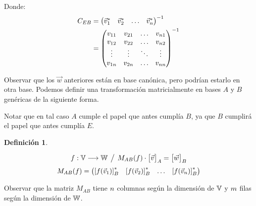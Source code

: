 \documentclass[a5paper,12pt,twoside]{book}
\newtheorem{defn}{{Definición}}[chapter]
\begin{document}
Donde:
\begin{align*}
    C_{EB} &=
    \begin{pmatrix}
        \Vec{v}_1^* & \Vec{v}_2^* & \dots & \Vec{v}_n^*
    \end{pmatrix}^{-1}
    \\
    &=
    \begin{pmatrix}
        v_{11} & v_{21} & \dots & v_{n 1}
        \\
        v_{12} & v_{22} & \dots & v_{n 2}
        \\
        \vdots & \vdots & \ddots & \vdots
        \\
        v_{1 n} & v_{2 n} & \dots & v_{n n}
    \end{pmatrix}^{-1}
\end{align*}

Observar que los $\Vec{w}$ anteriores están en base canónica, pero podrían estarlo en otra base.
Podemos definir una transformación matricialmente en bases $A$ y $B$ genéricas de la siguiente forma.

Notar que en tal caso $A$ cumple el papel que antes cumplía $B$, ya que $B$ cumplirá el papel que antes cumplía $E$.

\begin{mdframed}[style=DefinitionFrame]
    \begin{defn}
    \end{defn}
    \begin{equation*}
        f: \mathbb{V} \longrightarrow \mathbb{W} \hspace{1ex} \big/ \hspace{1ex} M_{AB}(f) \cdot { \begin{bmatrix} \Vec{v} \end{bmatrix} }_A = { \begin{bmatrix} \Vec{w} \end{bmatrix} }_B
    \end{equation*}
    \begin{equation*}
        M_{AB} (f) =
        \begin{pmatrix}
            \left[f(\Vec{v}_1)\right]_{B}^* &
            \left[f(\Vec{v}_2)\right]_{B}^* &
            \dots &
            \left[f(\Vec{v}_n)\right]_{B}^*
        \end{pmatrix}
    \end{equation*}
\end{mdframed}

Observar que la matriz $M_{AB}$ tiene $n$ columnas según la dimensión de $\mathbb{V}$ y $m$ filas según la dimensión de $\mathbb{W}$.
\end{document}

